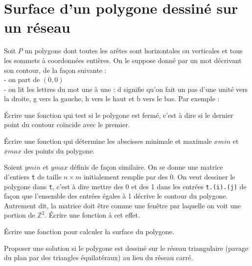 \renewcommand{\SourceFile}{6-geometrie-et-images/src/6-2.ml}

\section{Surface d'un polygone dessiné sur un réseau}

Soit $P$ un polygone dont toutes les arêtes sont horizontales ou verticales et tous les sommets à coordonnées entières. On le suppose donné par un mot décrivant son contour, de la façon suivante :\\
- on part de $(0,0)$\\
- on lit les lettres du mot une à une : \og d \fg{} signifie qu'on fait un pas d'une unité vers la droite, \og g \fg{} vers la gauche, \og h \fg{} vers le haut et \og b \fg{} vers le bas. Par exemple :
\medskip

\begin{center}
\end{center}

\Q
Écrire une fonction qui test si le polygone est fermé, c'est à dire si le dernier point du contour coïncide avec le premier.

\Q
Écrire une fonction qui détermine les abscisses minimale et maximale $xmin$ et $xmax$ des points du polygone.

\Q
Soient $ymin$ et $ymax$ définis de façon similaire. On se donne une matrice d'entiers \texttt{t} de taille $n \times m$ initialement remplie par des 0. On veut \og dessiner \fg{} le polygone dans \texttt{t}, c'est à dire mettre des 0 et des 1 dans les entrées \texttt{t.(i).(j)} de façon que l'ensemble des entrées égales à 1 décrive le contour du polygone. Autrement dit, la matrice doit être comme une \og fenêtre \fg{} par laquelle on voit une portion de $\mathbb{Z}^2$. Écrire une fonction à cet effet.

\Q
Écrire une fonction pour calculer la surface du polygone.

\Q
Proposer une solution si le polygone est dessiné sur le réseau triangulaire (pavage du plan par des triangles équilatéraux) au lieu du réseau carré.

